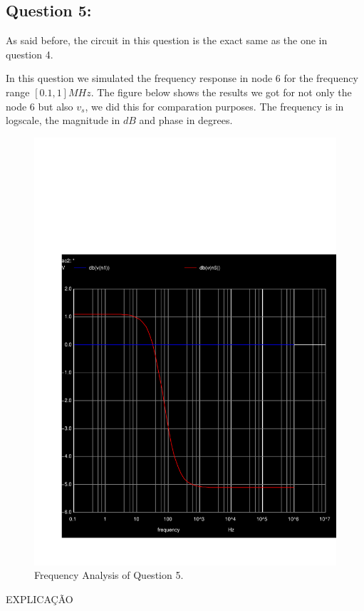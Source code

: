 \subsection{Question 5: }
As said before, the circuit in this question is the exact same as the one in question 4. \par
In this question we simulated the frequency response in node 6 for the frequency range $[0.1,1]MHz$.
The figure below shows the results we got for not only the node 6 but also $v_s$, we did this for comparation purposes. The frequency is in logscale, the magnitude in $dB$ and phase in degrees.
\begin{figure}[H] \centering
\includegraphics[width=0.7\linewidth]{../sim/fresponse.pdf}
\caption{Frequency Analysis of Question 5.}
\label{fig:fresponse}
\end{figure}
EXPLICAÇÃO

